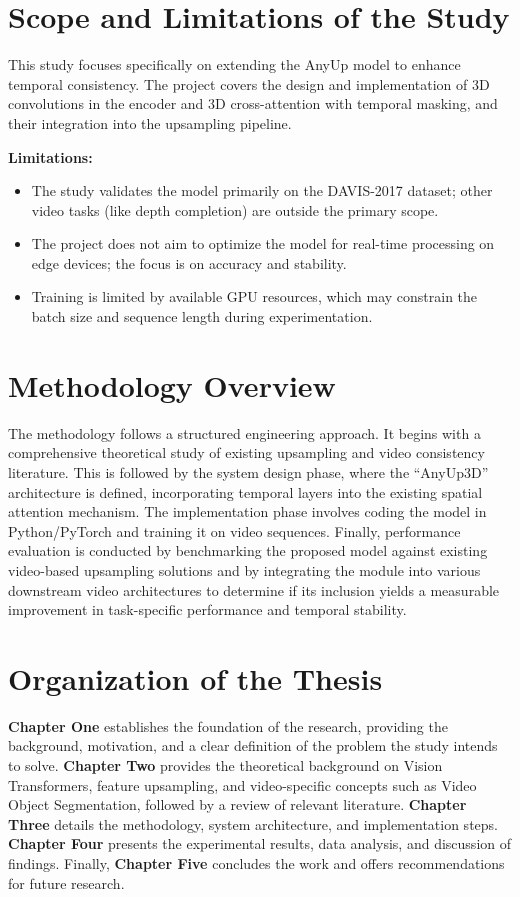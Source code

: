 \section{Scope and Limitations of the Study}
This study focuses specifically on extending the AnyUp model to enhance temporal consistency. The project covers the design and implementation of 3D convolutions in the encoder and 3D cross-attention with temporal masking, and their integration into the upsampling pipeline.

\textbf{Limitations:}
\begin{itemize}
    \item The study validates the model primarily on the DAVIS-2017 dataset; other video tasks (like depth completion) are outside the primary scope.
    \item The project does not aim to optimize the model for real-time processing on edge devices; the focus is on accuracy and stability.
    \item Training is limited by available GPU resources, which may constrain the batch size and sequence length during experimentation.
\end{itemize}

\section{Methodology Overview}
The methodology follows a structured engineering approach. It begins with a comprehensive theoretical study of existing upsampling and video consistency literature. This is followed by the system design phase, where the ``AnyUp3D'' architecture is defined, incorporating temporal layers into the existing spatial attention mechanism.  The implementation phase involves coding the model in Python/PyTorch and training it on video sequences. Finally, performance evaluation is conducted by benchmarking the proposed model against existing video-based upsampling solutions and by integrating the module into various downstream video architectures to determine if its inclusion yields a measurable improvement in task-specific performance and temporal stability.

\section{Organization of the Thesis}
\textbf{Chapter One} establishes the foundation of the research, providing the background, motivation, and a clear definition of the problem the study intends to solve. \textbf{Chapter Two} provides the theoretical background on Vision Transformers, feature upsampling, and video-specific concepts such as Video Object Segmentation, followed by a review of relevant literature. \textbf{Chapter Three} details the methodology, system architecture, and implementation steps. \textbf{Chapter Four} presents the experimental results, data analysis, and discussion of findings. Finally, \textbf{Chapter Five} concludes the work and offers recommendations for future research.